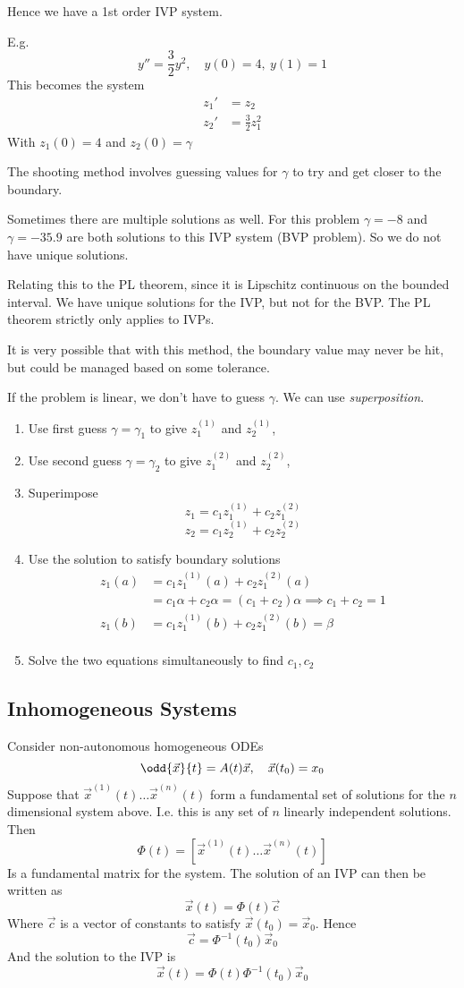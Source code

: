 \documentclass{X:/Documents/Coding/Latex/myassignment}
\begin{document}
Hence we have a 1st order IVP system.

E.g. 
\[y'' = \frac32 y^2, \quad y(0) = 4, \ y(1) = 1\]
This becomes the system
\begin{align*}
    z_1' &= z_2\\
    z_2' &= \frac32 z_1^2
\end{align*}
With $z_1(0) = 4$ and $z_2(0) = \gamma$

The shooting method involves guessing values for $\gamma$ to try and get closer to the boundary.

Sometimes there are multiple solutions as well. For this problem $\gamma = -8$ and $\gamma = -35.9$ are both solutions to this IVP system (BVP problem). So we do not have unique solutions.

Relating this to the PL theorem, since it is Lipschitz continuous on the bounded interval. We have unique solutions for the IVP, but not for the BVP. The PL theorem strictly only applies to IVPs. 

It is very possible that with this method, the boundary value may never be hit, but could be managed based on some tolerance.


If the problem is linear, we don't have to guess $\gamma$. We can use \textit{superposition}.
\begin{enumerate}
    \item Use first guess $\gamma=\gamma_1$ to give $z_1^{(1)}$ and $z_2^{(1)}$, 
    \item Use second guess $\gamma=\gamma_2$ to give $z_1^{(2)}$ and $z_2^{(2)}$,
    \item Superimpose
    \[z_1 = c_1 z_1^{(1)} + c_2 z_1^{(2)}\]
    \[z_2 = c_1 z_2^{(1)} + c_2 z_2^{(2)}\] 
    \item Use the solution to satisfy boundary solutions
    \begin{align*}
        z_1(a) &= c_1z_1^{(1)}(a) + c_2z_1^{(2)}(a)\\
        &= c_1 \alpha + c_2 \alpha = (c_1+c_2)\alpha \implies c_1 + c_2 = 1\\
        z_1(b) &= c_1z_1^{(1)}(b) + c_2z_1^{(2)}(b) = \beta\\
    \end{align*}
    \item Solve the two equations simultaneously to find $c_1, c_2$
\end{enumerate}


\subsection{Inhomogeneous Systems}
Consider non-autonomous homogeneous ODEs
\[\odd{\vec x}{t} = A(t) \vec x, \quad \vec x(t_0) = x_0\]
Suppose that $\vec x^{(1)}(t) \ldots \vec x^{(n)}(t)$ form a fundamental set of solutions for the $n$ dimensional system above. I.e. this is any set of $n$ linearly independent solutions. Then
\[\Phi(t) = \left[\vec x^{(1)}(t) \ldots \vec x^{(n)}(t)\right]\]
Is a fundamental matrix for the system.
The solution of an IVP can then be written as
\[\vec x(t) = \Phi(t)\vec c\]
Where $\vec c$ is a vector of constants to satisfy $\vec x(t_0) = \vec x_0$. Hence
\[\vec c = \Phi^{-1}(t_0) \vec x_0\]
And the solution to the IVP is
\[\vec x(t) = \Phi(t) \Phi^{-1}(t_0) \vec x_0\]
\end{document}
